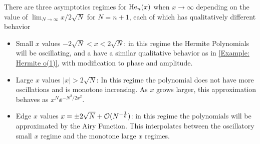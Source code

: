 \begin{exemplo}
	There are three asymptotics regimes for $\mathrm{He}_n(x)$ when $x \rightarrow \infty$ depending on the value of $\lim_{N \rightarrow \infty} x/2\sqrt{N}$ for $N = n+1$, each of which has qualitatively different behavior
	\begin{itemize}
		\item Small $x$ values $-2\sqrt{N} < x < 2\sqrt{N}$: in this regime the Hermite Polynomials will be oscillating, and a have a similar qualitative behavior as in \autoref{Example: Hermite o(1)}, with modification to phase and amplitude.
		\item Large $x$ values $|x| > 2\sqrt{N}$: In this regime the polynomial does not have more oscillations and is monotone increasing. As $x$ grows larger, this approximation behaves as $x^N \ee^{-N^2/2x^2}$.
		\item Edge $x$ values $x = \pm 2\sqrt{N} + \mathcal{O}(N^{-\frac{1}{6}})$: in this regime the polynomials will be approximated by the Airy Function. This interpolates between the oscillatory small $x$ regime and the monotone large $x$ regimes. 
	\end{itemize} 
	

\end{exemplo}
